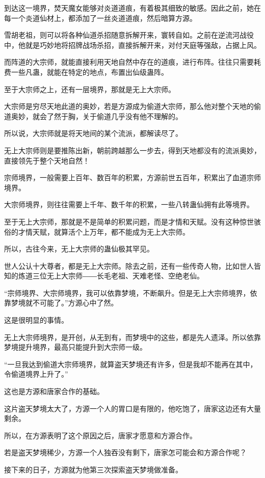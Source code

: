 \begin{this_body}
到达这一境界，焚天魔女能够对炎道道痕，有着极其细致的敏感。因此之前，她在每一个炎道仙材上，都添加了一丝炎道道痕，然后暗算方源。

雪胡老祖，则可以将各种仙道杀招随意拆解开来，寰转自如。之前在逆流河战役中，他就是巧妙地将招牌战场杀招，直接拆解开来，对付天庭等强敌，占据上风。

而阵道的大宗师，就能直接利用天地自然中存在的道痕，进行布阵。往往只需要耗费一些凡蛊，就能在特定的地点，布置出仙级蛊阵。

至于大宗师之上，还有一层境界，那就是无上大宗师。

大宗师是穷尽天地此道的奥妙，若是方源成为偷道大宗师，那么他对整个天地的偷道奥妙，就会了然于胸，关于偷道几乎没有他不理解的。

所以说，大宗师就是将天地间的某个流派，都解读尽了。

无上大宗师则是要推陈出新，朝前跨越那么一步去，得到天地都没有的流派奥妙，直接领先于整个天地自然！

宗师境界，一般需要上百年、数百年的积累，方源前世五百年，积累出了血道宗师境界。

大宗师境界，则往往需要上千年、数千年的积累，一些八转蛊仙拥有此等境界。

至于无上大宗师，那就是不是简单的积累问题，而是才情和天赋。没有这种惊世骇俗的才情天赋，就算活个上万年，都不能成为无上大宗师。

所以，古往今来，无上大宗师的蛊仙极其罕见。

世人公认十大尊者，都是无上大宗师。除去之前，还有一些传奇人物，比如世人皆知的炼道三位无上大宗师――长毛老祖、天难老怪、空绝老仙。

“宗师境界、大宗师境界，我可以依靠梦境，不断飙升。但是无上大宗师境界，依靠梦境就不可能了。”方源心中了然。

这是很明显的事情。

无上大宗师境界，是开创，从无到有，而梦境中的这些，都是先人遗泽。所以依靠梦境提升境界，最高只能提升到大宗师一级。

“一旦我达到偷道大宗师境界，就算盗天梦境还有许多，但是我却不能再在其中，令偷道境界上升了。”

这也是方源和唐家合作的基础。

这片盗天梦境太大了，方源一个人的胃口是有限的，他吃饱了，唐家这边还有大量剩余。

所以，在方源表明了这个原因之后，唐家才愿意和方源合作。

若是盗天梦境稀少，方源一个人独吞没有剩下，唐家怎可能会和方源合作呢？

接下来的日子，方源就为他第三次探索盗天梦境做准备。


\end{this_body}
